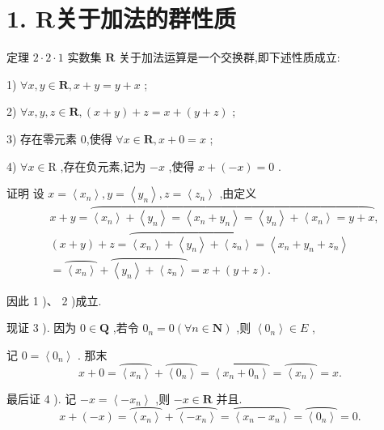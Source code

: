 \section*{1. R关于加法的群性质}

定理 $2 \cdot  2 \cdot  1$ 实数集 $\mathbf{R}$ 关于加法运算是一个交换群,即下述性质成立:

1) $\forall x,y \in  \mathbf{R},x + y = y + x$ ;

2) $\forall x,y,z \in  \mathbf{R},\left( {x + y}\right)  + z = x + \left( {y + z}\right)$ ;

3) 存在零元素 0,使得 $\forall x \in  \mathbf{R},x + 0 = x$ ;

4) $\forall x \in  \mathrm{R}$ ,存在负元素,记为 $- x$ ,使得 $x + \left( {-x}\right)  = 0$ .

证明 设 $x = \left\langle  {x}_{n}\right\rangle  ,y = \left\langle  {y}_{n}\right\rangle  ,z = \left\langle  {z}_{n}\right\rangle$ ,由定义
\begin{align*}
	&x + y = \overset{⏜}{\left\langle  {x}_{n}\right\rangle   + \left\langle  {y}_{n}\right\rangle   = \left\langle  {{x}_{n} + {y}_{n}}\right\rangle   = \left\langle  {y}_{n}\right\rangle   + \left\langle  {x}_{n}\right\rangle   = y + x},\\
	&\left( {x + y}\right)  + z = \overset{⏜}{\left\langle  {x}_{n}\right\rangle   + \left\langle  {y}_{n}\right\rangle   + \left\langle  {z}_{n}\right\rangle  } = \left\langle  {{x}_{n} + {y}_{n} + {z}_{n}}\right\rangle\\
	&= \overset{⏜}{\left\langle  {x}_{n}\right\rangle  } + \overset{⏜}{\left\langle  {y}_{n}\right\rangle   + \left\langle  {z}_{n}\right\rangle  } = x + \left( {y + z}\right) .
\end{align*}

因此 1 )、 2 )成立.

现证 3 ). 因为 $0 \in  \mathbf{Q}$ ,若令 ${0}_{n} = 0\left( {\forall n \in  \mathbf{N}}\right)$ ,则 $\left\langle  {0}_{n}\right\rangle   \in  E$ ,

记 $0 = \left\langle  {0}_{n}\right\rangle$ . 那末
$$x + 0 = \overset{⏜}{\left\langle  {x}_{n}\right\rangle  } + \overset{⏜}{\left\langle  {0}_{n}\right\rangle  } = \overset{⏜}{\left\langle  {x}_{n} + {0}_{n}\right\rangle  } = \overset{⏜}{\left\langle  {x}_{n}\right\rangle  } = x.$$

最后证 4 ). 记 $- x = \left\langle  {-{x}_{n}}\right\rangle$ ,则 $- x \in  \mathbf{R}$ 并且.
$$x + \left( {-x}\right)  = \overset{⏜}{\left\langle  {x}_{n}\right\rangle  } + \overset{⏜}{\left\langle  -{x}_{n}\right\rangle  } = \overset{⏜}{\left\langle  {x}_{n} - {x}_{n}\right\rangle  } = \overset{⏜}{\left\langle  {0}_{n}\right\rangle  } = 0.$$

